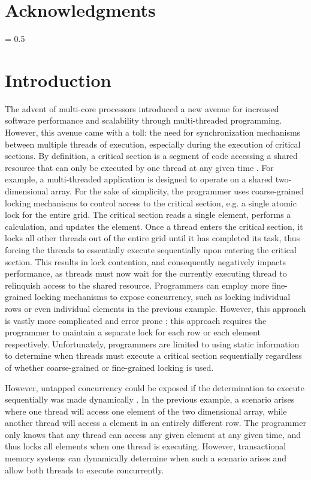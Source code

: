 \documentclass[a4paper]{article}
\begin{document}
\newpage
\thispagestyle{empty}
\section*{\textbf{Acknowledgments}}
\newpage
\thispagestyle{empty}
\tableofcontents
\newpage
\thispagestyle{empty}
\listoffigures
\listoftables
\parskip = 0.5\baselineskip
\newpage

\section{\textbf{Introduction}}

\indent 
The advent of multi-core processors introduced a new avenue for increased
software performance and scalability through multi-threaded programming.
However, this avenue came with a toll: the need for synchronization mechanisms
between multiple threads of execution, especially during the execution of
critical sections.  By definition, a critical section is a segment of code
accessing a shared resource that can only be executed by one thread at any given
time \cite{os_concepts}.  For example, a multi-threaded application is designed
to operate on a shared two-dimensional array.  For the sake of simplicity, the
programmer uses coarse-grained locking mechanisms to control access to the
critical section, e.g. a single atomic lock for the entire grid.  The critical
section reads a single element, performs a calculation, and updates the element.  Once
a thread enters the critical section, it locks all other threads out of the
entire grid until it has completed its task, thus forcing the threads to
essentially execute sequentially upon entering the critical section.  This
results in lock contention, and consequently negatively impacts performance, as
threads must now wait for the currently executing thread to relinquish access to
the shared resource.  Programmers can employ more fine-grained locking
mechanisms to expose concurrency, such as locking individual rows or even
individual elements in the previous example.  However, this approach is vastly more
complicated and error prone \cite{sle_rajwar}; this approach requires the
programmer to maintain a separate lock for each row or each element respectively.
Unfortunately, programmers are limited to using static information to determine
when threads must execute a critical section sequentially regardless of whether
coarse-grained or fine-grained locking is used.
\par

\indent
However, untapped concurrency could be exposed if the determination to execute
sequentially was made dynamically \cite{intel_prog_ref}.  In the previous
example, a scenario arises where one thread will access one element of the two
dimensional array, while another thread will access a element in an entirely
different row.  The programmer only knows that any thread can access any given
element at any given time, and thus locks all elements when one thread is executing.
However, transactional memory systems can dynamically determine when such a
scenario arises and allow both threads to execute concurrently.
\par
\end{document}
